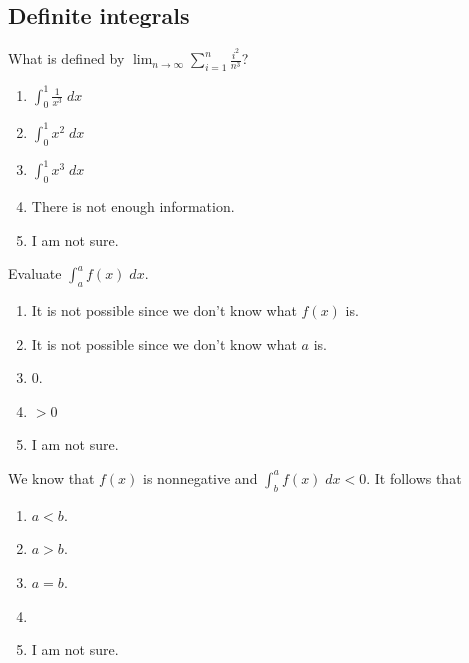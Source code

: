 \documentclass[aspectratio=169, 14pt, t]{beamer}  %
\begin{document}
\subsection{Definite integrals}

\begin{poll}
  What is defined by \(\lim_{n \to \infty} \sum_{i=1}^{n} \frac{i^{2}}{n^{3}}\)?

  \begin{enumerate}
    \item \(\int_{0}^{1} \frac{1}{x^{3}} \;dx\)
    \item \(\int_{0}^{1} x^{2} \;dx\)
    \item \(\int_{0}^{1} x^{3} \;dx\)
    \item There is not enough information.
    \item I am not sure.
  \end{enumerate}
\end{poll}

\begin{poll}
  Evaluate \(\int_{a}^{a} f(x) \;dx\).

  \begin{enumerate} \setlength\itemsep{1ex}
    \item It is not possible since we don't know what \(f(x)\) is.
    \item It is not possible since we don't know what \(a\) is.
    \item \(0\).
    \item \(> 0\)
    \item I am not sure.
  \end{enumerate}
\end{poll}

\begin{poll}
  We know that \(f(x)\) is nonnegative and \(\int_{b}^{a} f(x) \;dx < 0\). It follows that

  \begin{enumerate} \setlength\itemsep{1ex}
    \item \(a < b\).
    \item \(a > b\).
    \item \(a = b\).
    \item
    \item I am not sure.
  \end{enumerate}
\end{poll}
\end{document}
